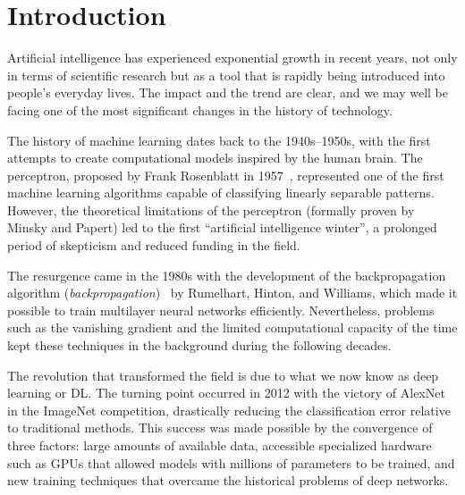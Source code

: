 \chapter{Introduction}\label{ch:intro}

Artificial intelligence has experienced exponential growth in recent years, not only in terms of scientific research but as a tool that is rapidly being introduced into people's everyday lives. The impact and the trend are clear, and we may well be facing one of the most significant changes in the history of technology.

The history of machine learning dates back to the 1940s--1950s, with the first attempts to create computational models inspired by the human brain. The perceptron, proposed by Frank Rosenblatt in 1957~\citep{rosenblatt1958perceptron}, represented one of the first machine learning algorithms capable of classifying linearly separable patterns. However, the theoretical limitations of the perceptron (formally proven by Minsky and Papert) led to the first ``artificial intelligence winter'', a prolonged period of skepticism and reduced funding in the field.

The resurgence came in the 1980s with the development of the backpropagation algorithm (\textit{backpropagation})~\citep{backpropagation} by Rumelhart, Hinton, and Williams, which made it possible to train multilayer neural networks efficiently. Nevertheless, problems such as the vanishing gradient and the limited computational capacity of the time kept these techniques in the background during the following decades.

The revolution that transformed the field is due to what we now know as deep learning or \gls{DL}. The turning point occurred in 2012 with the victory of AlexNet~\citep{alexnet} in the ImageNet competition, drastically reducing the classification error relative to traditional methods. This success was made possible by the convergence of three factors: large amounts of available data, accessible specialized hardware such as \glspl{GPU} that allowed models with millions of parameters to be trained, and new training techniques that overcame the historical problems of deep networks.

